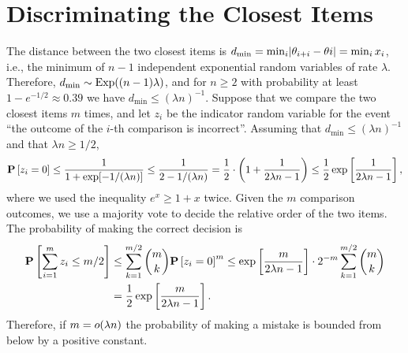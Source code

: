 \section{Discriminating the Closest Items}  %
\label{app:adjacent}


The distance between the two closest items is $d_{\min} = \min_i \lvert \theta_{i+i} - \theta{i} \rvert = \min_i x_i$, i.e., the minimum of $n-1$ independent exponential random variables of rate $\lambda$.
Therefore, $d_{\min} \sim \mathrm{Exp}( (n-1)\lambda )$, and for $n \ge 2$ with probability at least $1 - e^{-1/2} \approx 0.39$ we have $d_{\min} \le (\lambda n)^{-1}$.
Suppose that we compare the two closest items $m$ times, and let $z_i$ be the indicator random variable for the event ``the outcome of the $i$-th comparison is incorrect''.
Assuming that $d_{\min} \le (\lambda n)^{-1}$ and that $\lambda n \ge 1/2$,
\begin{align*}
\mathbf{P}\left[ z_i = 0 \right]
    \le \frac{1}{1 + \exp[-1 / (\lambda n)]} \le \frac{1}{2 - 1/(\lambda n)}
    = \frac{1}{2} \cdot \left( 1 + \frac{1}{2\lambda n - 1} \right)
    \le \frac{1}{2} \exp \left[ \frac{1}{2\lambda n - 1} \right],
\end{align*}
where we used the inequality $e^{x} \ge 1 + x$ twice.
Given the $m$ comparison outcomes, we use a majority vote to decide the relative order of the two items.
The probability of making the correct decision is
\begin{align*}
\mathbf{P}\left[ \sum_{i = 1}^m z_i \le m/2 \right]
    &\le \sum_{k = 1}^{m/2} \binom{m}{k} \mathbf{P}\left[ z_i = 0 \right]^m
     \le \exp \left[ \frac{m}{2\lambda n - 1} \right] \cdot 2^{-m} \sum_{k = 1}^{m/2} \binom{m}{k} \\
    &= \frac{1}{2} \exp \left[ \frac{m}{2\lambda n - 1} \right].
\end{align*}
Therefore, if $m = o(\lambda n)$ the probability of making a mistake is bounded from below by a positive constant.
